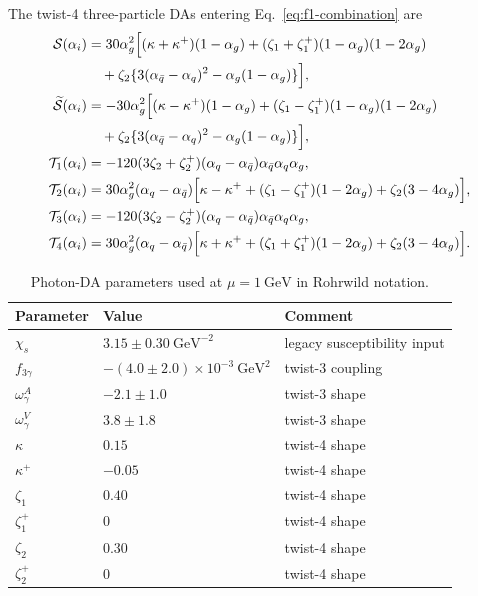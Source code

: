 \documentclass[aps,prd,preprint,nofootinbib,superscriptaddress]{revtex4-2}
\newcommand{\GeV}{\mathrm{GeV}}
\begin{document}
The twist-4 three-particle DAs entering Eq.~\eqref{eq:f1-combination} are
\begin{align}
  {\cal S}(\alpha_i)
  &=
  30\alpha_g^2
  \Big[
  (\kappa+\kappa^+)(1-\alpha_g)
  +(\zeta_1+\zeta_1^+)(1-\alpha_g)(1-2\alpha_g)
  \notag\\
  &\quad
  +\zeta_2\{3(\alpha_{\bar q}-\alpha_q)^2-\alpha_g(1-\alpha_g)\}
  \Big],
  \label{eq:app-S}\\
  \widetilde{\cal S}(\alpha_i)
  &=
  -30\alpha_g^2
  \Big[
  (\kappa-\kappa^+)(1-\alpha_g)
  +(\zeta_1-\zeta_1^+)(1-\alpha_g)(1-2\alpha_g)
  \notag\\
  &\quad
  +\zeta_2\{3(\alpha_{\bar q}-\alpha_q)^2-\alpha_g(1-\alpha_g)\}
  \Big],
  \label{eq:app-Stilde}\\
  {\cal T}_1(\alpha_i)
  &=
  -120(3\zeta_2+\zeta_2^+)
  (\alpha_q-\alpha_{\bar q})\alpha_{\bar q}\alpha_q\alpha_g,
  \label{eq:app-T1}\\
  {\cal T}_2(\alpha_i)
  &=
  30\alpha_g^2(\alpha_q-\alpha_{\bar q})
  \Big[
  \kappa-\kappa^+
  +(\zeta_1-\zeta_1^+)(1-2\alpha_g)
  +\zeta_2(3-4\alpha_g)
  \Big],
  \label{eq:app-T2}\\
  {\cal T}_3(\alpha_i)
  &=
  -120(3\zeta_2-\zeta_2^+)
  (\alpha_q-\alpha_{\bar q})\alpha_{\bar q}\alpha_q\alpha_g,
  \label{eq:app-T3}\\
  {\cal T}_4(\alpha_i)
  &=
  30\alpha_g^2(\alpha_q-\alpha_{\bar q})
  \Big[
  \kappa+\kappa^+
  +(\zeta_1+\zeta_1^+)(1-2\alpha_g)
  +\zeta_2(3-4\alpha_g)
  \Big].
  \label{eq:app-T4}
\end{align}

\begin{table}[t]
\caption{Photon-DA parameters used at $\mu=1~\GeV$ in Rohrwild notation.}
\label{tab:app-photon-params}
\begin{ruledtabular}
\begin{tabular}{lll}
Parameter & Value & Comment\\
\hline
$\chi_s$ & $3.15\pm0.30~\GeV^{-2}$ & legacy susceptibility input\\
$f_{3\gamma}$ & $-(4.0\pm2.0)\times10^{-3}~\GeV^2$ & twist-3 coupling\\
$\omega_\gamma^A$ & $-2.1\pm1.0$ & twist-3 shape\\
$\omega_\gamma^V$ & $3.8\pm1.8$ & twist-3 shape\\
$\kappa$ & $0.15$ & twist-4 shape\\
$\kappa^+$ & $-0.05$ & twist-4 shape\\
$\zeta_1$ & $0.40$ & twist-4 shape\\
$\zeta_1^+$ & $0$ & twist-4 shape\\
$\zeta_2$ & $0.30$ & twist-4 shape\\
$\zeta_2^+$ & $0$ & twist-4 shape\\
\end{tabular}
\end{ruledtabular}
\end{table}
\end{document}

